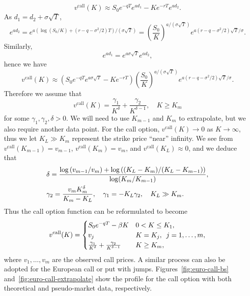 	\begin{equation*}
		v^{\text{call}}(K) \approx S_0 e^{-q T} e^{a d_1} - K e^{-r T} e^{a d_2}.
	\end{equation*}
As $d_1 = d_2 + \sigma \sqrt{T}$,
	\begin{equation*}
		e^{a d_2} = e^{a\left(\log(S_0/K) + (r - q - \sigma^2/2) T\right)/\left(\sigma \sqrt{T}\right)} = \left(\frac{S_0}{K}\right)^{a/\left(\sigma \sqrt{T}\right)} e^{a(r - q - \sigma^2/2) \sqrt{T}/\sigma}.
	\end{equation*}
Similarly,
	\begin{equation*}
		e^{a d_1} = e^{a \sigma \sqrt{T}} e^{a d_2},
	\end{equation*}
hence we have
	\begin{equation*}
		v^{\text{call}}(K) \approx \left(S_0 e^{-q T} e^{a \sigma \sqrt{T}} - K e^{-r T}\right) \left(\frac			{S_0}{K}\right)^{a/\left(\sigma \sqrt{T}\right)} e^{a (r - q - \sigma^2/2) \sqrt{T}/\sigma}.
	\end{equation*}
Therefore we assume that
	\begin{equation*}
		v^{\text{call}}(K) = \frac{\gamma_1}{K^\delta} + \frac{\gamma_2}{K^{\delta-1}}, \quad K \ge K_{m}
	\end{equation*}
for some $\gamma_1,\gamma_2, \delta > 0$. We will need to use $K_{m-1}$ and $K_{m}$ to extrapolate, but we also require another data point. For the call option, $v^{\text{call}}(K) \rightarrow 0$ as $K \rightarrow \infty$, thus we let $K_L \gg K_m$ represent the strike price ``near'' infinity. We see from $v^{\text{call}}(K_{m - 1}) = v_{m - 1}$, $v^{\text{call}}(K_m) = v_m$, and $v^{\text{call}}(K_L) \approx 0$, and we deduce that
	\begin{align*}
		&\delta = \frac{\log\left( v_{m-1}/v_m\right) + \log\left((K_L - K_m)/(K_L-K_{m-1}) \right)}{\log(K_{m}/K_{m-1})}, \\
		&\gamma_2 = \frac{v_mK_m^\delta}{K_m - K_L}, \quad
		\gamma_1 = -K_L \gamma_2, \quad K_L \gg K_m.
	\end{align*}
Thus the call option function can be reformulated to become
	\begin{equation}
		\label{call-interpolate}
		v^\text{call}(K) =
			\begin{cases}
				S_0e^{-qT} - \beta K & 0 < K \le K_1,\\
				v_j & K = K_j, \enskip j = 1,\ldots,m,\\
				\frac{\gamma_1}{K^\delta} + \frac{\gamma_2}{K^{\delta-1}} & K \ge K_{m},
			\end{cases}
	\end{equation}
where $v_1,\ldots,v_m$ are the observed call prices. A similar process can also be adopted for the European call or put with jumps. Figures~\ref{fig:euro-call-bs} and~\ref{fig:euro-call-extrapolate} show the profile for the call option with both theoretical and pseudo-market data, respectively.

